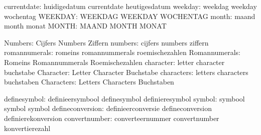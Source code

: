                   currentdate:  huidigedatum                 currentdate
                                heutigesdatum
                      weekday:  weekdag                      weekday
                                wochentag
                      WEEKDAY:  WEEKDAG                      WEEKDAY
                                WOCHENTAG
                        month:  maand                        month
                                monat
                        MONTH:  MAAND                        MONTH
                                MONAT

                      Numbers:  Cijfers                      Numbers
                                Ziffern
                      numbers:  cijfers                      numbers
                                ziffern
                romannumerals:  romeins                      romannummerals
                                roemischezahlen
                Romannumerals:  Romeins                      Romannummerals
                                Roemischezahlen
                    character:  letter                       character
                                buchstabe
                    Character:  Letter                       Character
                                Buchstabe
                   characters:  letters                      characters
                                buchstaben
                   Characters:  Letters                      Characters
                                Buchstaben

                 definesymbol:  definieersymbool             definesymbol
                                definieresymbol
                       symbol:  symbool                      symbol
                                symbol
             defineconversion:  definieerconversie           defineconversion
                                definierekonversion
                convertnumber:  converteernummer             convertnumber
                                konvertierezahl

